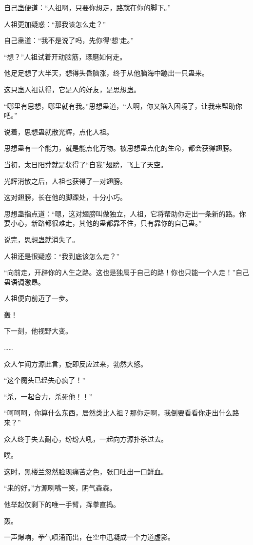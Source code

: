 \begin{this_body}
自己蛊便道：“人祖啊，只要你想走，路就在你的脚下。”

人祖更加疑惑：“那我该怎么走？”

自己蛊道：“我不是说了吗，先你得‘想’走。”

“想？”人祖试着开动脑筋，琢磨如何走。

他足足想了大半天，想得头昏脑涨，终于从他脑海中蹦出一只蛊来。

这只蛊人祖认得，它是人的好友，是思想蛊。

“哪里有思想，哪里就有我。”思想蛊道，“人啊，你又陷入困境了，让我来帮助你吧。”

说着，思想蛊就散光辉，点化人祖。

思想蛊有一个能力，就是能点化万物。被思想蛊点化的生命，都会获得翅膀。

当初，太日阳莽就是获得了“自我”翅膀，飞上了天空。

光辉消散之后，人祖也获得了一对翅膀。

这对翅膀，长在他的脚踝处，十分小巧。

思想蛊指点道：“嗯，这对翅膀叫做独立，人祖，它将帮助你走出一条新的路。你要小心，新路都很难走，其他的蛊都靠不住，只有靠你的自己蛊。”

说完，思想蛊就消失了。

人祖还是很疑惑：“我到底该怎么走？”

“向前走，开辟你的人生之路。这也是独属于自己的路！你也只能一个人走！”自己蛊语调激昂。

人祖便向前迈了一步。

轰！

下一刻，他视野大变。

……

众人乍闻方源此言，旋即反应过来，勃然大怒。

“这个魔头已经失心疯了！”

“杀，一起合力，杀死他！！”

“呵呵呵，你算什么东西，居然类比人祖？那你走啊，我倒要看看你走出什么路来？”

众人终于失去耐心，纷纷大吼，一起向方源扑杀过去。

噗。

这时，黑楼兰忽然脸现痛苦之色，张口吐出一口鲜血。

“来的好。”方源咧嘴一笑，阴气森森。

他举起仅剩下的唯一手臂，挥拳直捣。

轰。

一声爆响，拳气喷涌而出，在空中迅凝成一个力道虚影。

\end{this_body}

